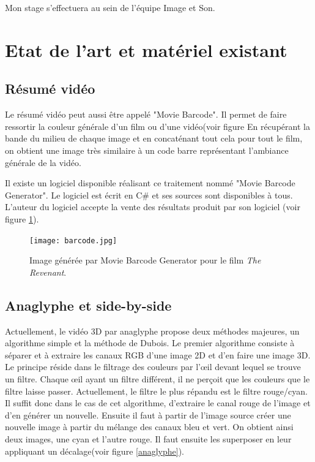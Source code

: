 \documentclass[10pt,a4paper]{article}
\begin{document}
Mon stage s'effectuera au sein de l'équipe Image et Son.

\section{Etat de l'art et matériel existant}


\subsection{Résumé vidéo}

Le résumé vidéo peut aussi être appelé "Movie Barcode". Il permet de faire ressortir la couleur générale d'un film ou d'une vidéo(voir figure 
En récupérant la bande du milieu de chaque image et en concaténant tout cela pour
tout le film, on obtient une image très similaire à un code barre représentant l'ambiance générale de la vidéo.

Il existe un logiciel disponible réalisant ce traitement nommé "Movie Barcode Generator". Le logiciel est écrit en C\# et ses sources sont disponibles à tous\cite{barcode}. L'auteur du logiciel accepte la vente des résultats produit par son logiciel (voir figure \ref{moviebarcodegenerator}).
\begin{figure}[h]
\center
\texttt{[image: barcode.jpg]}
\caption{Image générée par Movie Barcode Generator pour le film \textit{The Revenant}.}
\label{moviebarcodegenerator}
\end{figure}


\newpage
\subsection{Anaglyphe et side-by-side}
\label{anasbs}
Actuellement, le vidéo 3D par anaglyphe propose deux méthodes majeures, un algorithme simple et la méthode de Dubois.
Le premier algorithme consiste à séparer et à extraire les canaux RGB d'une image 2D et d'en faire une image 3D. Le principe réside dans le filtrage des couleurs par l'œil devant lequel se trouve un filtre.
Chaque œil ayant un filtre différent, il ne perçoit que les couleurs que le filtre laisse passer. Actuellement, le filtre le plus répandu est le filtre rouge/cyan.
Il suffit donc dans le cas de cet algorithme, d'extraire le canal rouge de l'image et d'en générer un nouvelle. Ensuite il faut à partir de l'image source créer une nouvelle image à partir du mélange des canaux bleu et vert.
On obtient ainsi deux images, une cyan et l'autre rouge. Il faut ensuite les superposer en leur appliquant un décalage(voir figure \ref{anaglyphe}).\newline
\end{document}
